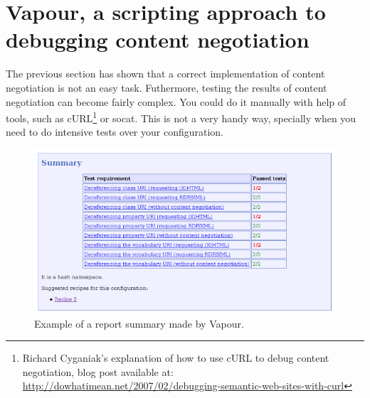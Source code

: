 \documentclass{../templates/llncs}
\begin{document}


\section{\label{sec:vapour}Vapour, a scripting approach to debugging content negotiation}

The previous section has shown that a correct implementation of content negotiation 
is not an easy task. Futhermore, testing the results of content negotiation can become 
fairly complex. You could do it manually with help of tools, such as 
cURL\footnote{Richard Cyganiak's explanation of how to use cURL to debug content negotiation, 
blog post available at: \url{http://dowhatimean.net/2007/02/debugging-semantic-web-sites-with-curl}}
or socat. This is not a very handy way, specially when you need to do 
intensive tests over your configuration.

\begin{figure}
 \centering
 \includegraphics[width=12cm]{images/report-summary.png}
 \caption{\label{fig:report-summary}Example of a report summary made by Vapour.}
\end{figure}
\end{document}
